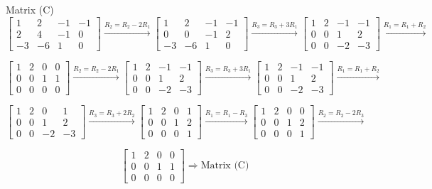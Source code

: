 \documentclass[letter,11pt]{article}
\begin{document}
\begin{tcolorbox}[boxrule=1mm, width=(.9\linewidth),before=\hfill,after=\hfill, adjusted title={Problem 2 Solution}]
Matrix (C)
\tcblower
$$\begin{bmatrix}
1 & 2 & -1 & -1 \\
2 & 4 & -1 & 0 \\
-3 & -6 & 1 & 0
\end{bmatrix} \xrightarrow{R_2 = R_2 - 2R_1}
\begin{bmatrix}
1 & 2 & -1 & -1 \\
0 & 0 & -1 & 2 \\
-3 & -6 & 1 & 0
\end{bmatrix}\xrightarrow{R_3 = R_3 +3R_1}
\begin{bmatrix}
1 & 2 & -1 & -1 \\
0 & 0 & 1 & 2 \\
0 & 0 & -2 & -3
\end{bmatrix}\xrightarrow{R_1 = R_1 +R_2}$$

$$\begin{bmatrix}
1 & 2 & 0 & 0 \\
0 & 0 & 1 & 1 \\
0 & 0 & 0 & 0
\end{bmatrix} \xrightarrow{R_2 = R_2 - 2R_1}
\begin{bmatrix}
1 & 2 & -1 & -1 \\
0 & 0 & 1 & 2 \\
0 & 0 & -2 & -3
\end{bmatrix}\xrightarrow{R_3 = R_3 +3R_1}
\begin{bmatrix}
1 & 2 & -1 & -1 \\
0 & 0 & 1 & 2 \\
0 & 0 & -2 & -3
\end{bmatrix}\xrightarrow{R_1 = R_1 +R_2}$$

$$\begin{bmatrix}
1 & 2 & 0 & 1 \\
0 & 0 & 1 & 2 \\
0 & 0 & -2 & -3
\end{bmatrix}\xrightarrow{R_3 = R_3 +2R_2}
\begin{bmatrix}
1 & 2 & 0 & 1 \\
0 & 0 & 1 & 2 \\
0 & 0 & 0 & 1
\end{bmatrix}\xrightarrow{R_1 = R_1 -R_3}
\begin{bmatrix}
1 & 2 & 0 & 0 \\
0 & 0 & 1 & 2 \\
0 & 0 & 0 & 1
\end{bmatrix}\xrightarrow{R_2 = R_2 -2R_3}$$

$$\begin{bmatrix}
1 & 2 & 0 & 0 \\
0 & 0 & 1 & 1 \\
0 & 0 & 0 & 0
\end{bmatrix} \Longrightarrow \text{Matrix (C)}$$

\end{tcolorbox}
\end{document}

